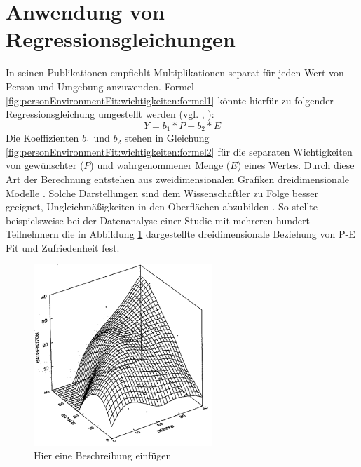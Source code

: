 \section{Anwendung von Regressionsgleichungen}
\label{ch:personEnvironmentFit:regressionsgleichungen}
In seinen Publikationen empfiehlt \textcite[S. 51ff.]{edwards:1991}\cite[S. 9ff.]{edwards:1990}\cite[S. 2ff.]{edwards:1993}\cite[S. 2ff.]{edwards:1993b} Multiplikationen separat für jeden Wert von Person und Umgebung anzuwenden. Formel \ref{fig:personEnvironmentFit:wichtigkeiten:formel1} könnte hierfür zu folgender Regressionsgleichung umgestellt werden (vgl. \cite[S. 9f.]{edwards:1990}, \cite[S. 2f.]{edwards:1993b}):
\begin{equation}
	Y = b_1 * P - b_2 * E
	\label{fig:personEnvironmentFit:wichtigkeiten:formel2}
\end{equation}
Die Koeffizienten $b_1$ und $b_2$ stehen in Gleichung \ref{fig:personEnvironmentFit:wichtigkeiten:formel2} für die separaten Wichtigkeiten von gewünschter ($P$) und wahrgenommener Menge ($E$) eines Wertes. Durch diese Art der Berechnung entstehen aus zweidimensionalen Grafiken dreidimensionale Modelle \cite[S. 2]{edwards:1993}. Solche Darstellungen sind dem Wissenschaftler zu Folge besser geeignet, Ungleichmäßigkeiten in den Oberflächen abzubilden \cite[S. 51ff.]{edwards:1991}. So stellte \textcite[S. 53ff.]{edwards:1991} beispielsweise bei der Datenanalyse einer Studie mit mehreren hundert Teilnehmern die in Abbildung \ref{fig:personEnvironmentFit:wichtigkeiten:abb2} dargestellte dreidimensionale Beziehung von P-E Fit und Zufriedenheit fest.\\
\begin{figure}[h]
	\centering
	\includegraphics[width=0.6\textwidth]{gfx/drei_d_modell.png}
	\caption{Hier eine Beschreibung einfügen \cite[S. 57]{edwards:1991}}
	\label{fig:personEnvironmentFit:wichtigkeiten:abb2}
\end{figure}\\
